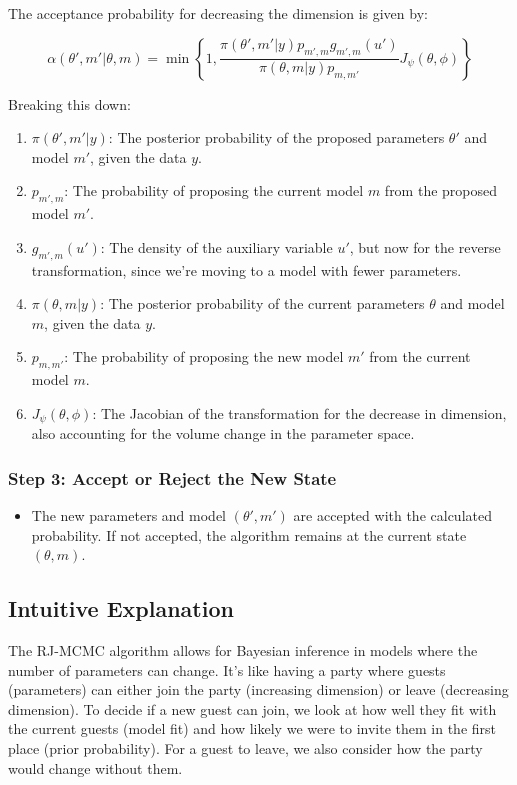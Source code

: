 \documentclass[10pt]{article}
\begin{document}
The acceptance probability for decreasing the dimension is given by:

\[ \alpha(\theta', m'|\theta, m) = \min \left\{ 1, \frac{\pi(\theta', m'|y)p_{m',m}g_{m',m}(u')}{\pi(\theta, m|y)p_{m,m'}}J_\psi(\theta, \phi) \right\} \]

Breaking this down:

\begin{enumerate}
  \item \( \pi(\theta', m'|y) \): The posterior probability of the proposed parameters \( \theta' \) and model \( m' \), given the data \( y \).

  \item \( p_{m',m} \): The probability of proposing the current model \( m \) from the proposed model \( m' \).

  \item \( g_{m',m}(u') \): The density of the auxiliary variable \( u' \), but now for the reverse transformation, since we're moving to a model with fewer parameters.

  \item \( \pi(\theta, m|y) \): The posterior probability of the current parameters \( \theta \) and model \( m \), given the data \( y \).

  \item \( p_{m,m'} \): The probability of proposing the new model \( m' \) from the current model \( m \).

  \item \( J_\psi(\theta, \phi) \): The Jacobian of the transformation for the decrease in dimension, also accounting for the volume change in the parameter space.

\end{enumerate}

\subsubsection*{Step 3: Accept or Reject the New State}
\begin{itemize}
  \item The new parameters and model \( (\theta', m') \) are accepted with the calculated probability. If not accepted, the algorithm remains at the current state \( (\theta, m) \).
\end{itemize}

\subsection*{Intuitive Explanation}
The RJ-MCMC algorithm allows for Bayesian inference in models where the number of parameters can change. It's like having a party where guests (parameters) can either join the party (increasing dimension) or leave (decreasing dimension). To decide if a new guest can join, we look at how well they fit with the current guests (model fit) and how likely we were to invite them in the first place (prior probability). For a guest to leave, we also consider how the party would change without them.
\end{document}
